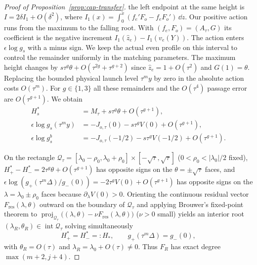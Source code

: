 \begin{proof}[Proof of Proposition~\ref{prop:cap-transfer}]
the left endpoint at the same height is $I=2\delta I_1+O(\delta^2)$, where
$I_1(x)=\int_0^x(f_e'F_o-f_eF_o')\,\dd z$.
Our positive action runs from the maximum to the falling root. With
$(f_e,F_o)=(A_\tau,G)$ its coefficient is the negative increment
$I_1(\widehat z_e)-I_1(v_e(Y))$. The action enters $\epsilon\log g_s$
with a minus sign. We keep the actual even profile on this interval to control the
remainder uniformly in the matching parameters.
The maximum height changes by $s\tau^g\theta+O(\tau^{2g}+\tau^{g+2})$
since $\widehat z_e=1+O(\tau^2)$ and $G(1)=\theta$. Replacing the
bounded physical launch level $\tau^m y$ by zero in the absolute
action costs $O(\tau^m)$. For $g\in\{1,3\}$ all these remainders
and the $O(\tau^4)$ passage error are $O(\tau^{g+1})$. We obtain
\begin{align}
  H_s^* &= M_\tau + s\tau^g\theta + O(\tau^{g+1}),\nonumber\\
  \epsilon\log g_s(\tau^m y) &= -J_{o,\tau}(0) - s\tau^g V(0) + O(\tau^{g+1}),\label{eq:cap-coarse}\\
  \epsilon\log g_s^b &= -J_{o,\tau}(-1/2) - s\tau^g V(-1/2) + O(\tau^{g+1}).\nonumber
\end{align}

On the rectangle $\mathcal{Q}_\tau=[\lambda_0-\rho_0,\lambda_0+\rho_0]\times[-\sqrt\tau,\sqrt\tau]$ ($0<\rho_0<|\lambda_0|/2$ fixed), $H_+^*-H_-^*=2\tau^g\theta+O(\tau^{g+1})$ has opposite signs on the $\theta=\pm\sqrt\tau$ faces, and $\epsilon\log(g_+(\tau^m\Delta)/g_-(0))=-2\tau^g V(0)+O(\tau^{g+1})$ has opposite signs on the $\lambda=\lambda_0\pm\rho_0$ faces because $\partial_\lambda V(0)>0$. Orienting the continuous residual vector $F_{\mathrm{res}}(\lambda,\theta)$ outward on the boundary of $\mathcal{Q}_\tau$ and applying Brouwer's fixed-point theorem to $\operatorname{proj}_{\mathcal{Q}_\tau}\big((\lambda,\theta)-\nu F_{\mathrm{res}}(\lambda,\theta)\big)$ ($\nu>0$ small) yields an interior root $(\lambda_R,\theta_R)\in\operatorname{int}\mathcal{Q}_\tau$ solving simultaneously
\begin{equation}\label{eq:cap-matches}
  H_+^* = H_-^* =: H_*,\qquad g_+(\tau^m\Delta) = g_-(0),
\end{equation}
with $\theta_R=O(\tau)$ and $\lambda_R=\lambda_0+O(\tau)\neq 0$. Thus $F_R$ has exact degree $\max(m+2,j+4)$.


\end{proof}
